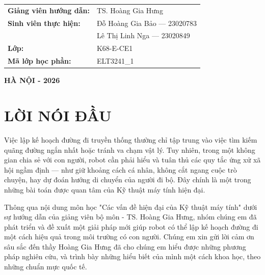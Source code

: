 \documentclass[12pt]{article}
\begin{document}
\begin{titlepage}
    \begin{center}
        \noindent %
        \begin{minipage}{\textwidth} %
            \centering
            \large
            \begin{tabular}{l l}
                \textbf{Giảng viên hướng dẫn:} & TS. Hoàng Gia Hưng \\[0.3cm]
                \textbf{Sinh viên thực hiện:}  & Đỗ Hoàng Gia Bảo --- 23020783 \\
                                               & Lê Thị Linh Nga --- 23020849 \\[0.3cm]
                \textbf{Lớp:}                  & K68-E-CE1 \\
                \textbf{Mã lớp học phần:}       & ELT3241\_1
            \end{tabular}
        \end{minipage}
    \end{center}
    
    \vfill
    
    \textbf{\large HÀ NỘI - 2026}
    \vspace{0.8cm}

    \restoregeometry %
\end{titlepage}

\newpage
\setlength{\parindent}{0.5cm}
\section*{LỜI NÓI ĐẦU}
Việc lập kế hoạch đường đi truyền thống thường chỉ tập trung vào việc tìm kiếm quãng đường ngắn nhất hoặc tránh va chạm vật lý. Tuy nhiên, trong một không gian chia sẻ với con người, robot cần phải hiểu và tuân thủ các quy tắc ứng xử xã hội ngầm định — như giữ khoảng cách cá nhân, không cắt ngang cuộc trò chuyện, hay dự đoán hướng di chuyển của người đi bộ. Đây chính là một trong những bài toán được quan tâm của Kỹ thuật máy tính hiện đại.  

Thông qua nội dung môn học "Các vấn đề hiện đại của Kỹ thuật máy tính" dưới sự hướng dẫn của giảng viên bộ môn - TS. Hoàng Gia Hưng, nhóm chúng em đã phát triển và đề xuất một giải pháp mới giúp robot có thể lập kế hoạch đường đi một cách hiệu quả trong môi trường có con người. Chúng em xin gửi lời cảm ơn sâu sắc đến thầy Hoàng Gia Hưng đã cho chúng em hiểu được những phương pháp nghiên cứu, và trình bày những hiểu biết của mình một cách khoa học, theo những chuẩn mực quốc tế. 
\end{document}

